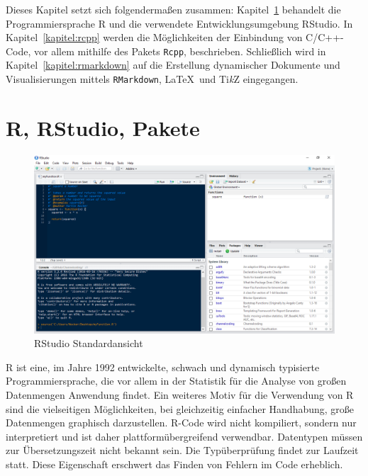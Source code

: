 Dieses Kapitel setzt sich folgendermaßen zusammen: Kapitel~\ref{kapitel:R} behandelt die Programmiersprache R und die verwendete Entwicklungsumgebung RStudio. In Kapitel~\ref{kapitel:rcpp} werden die Möglichkeiten der Einbindung von C/C++-Code, vor allem mithilfe des Pakets \texttt{Rcpp}, beschrieben. Schließlich wird in Kapitel~\ref{kapitel:rmarkdown} auf die Erstellung dynamischer Dokumente und Visualisierungen mittels \texttt{RMarkdown}, \LaTeX\ und Ti\textit{k}Z eingegangen.
\section{R, RStudio, Pakete}
\label{kapitel:R}
\begin{figure}[t]
\centering
\includegraphics[width=\ScaleIfNeeded]{abbildungen/rstudio}
\caption{RStudio Standardansicht}
\label{abb:rstudio}
\end{figure}
R ist eine, im Jahre 1992 entwickelte, schwach und dynamisch typisierte Programmiersprache, die vor allem in der Statistik für die Analyse von großen Datenmengen Anwendung findet. Ein weiteres Motiv für die Verwendung von R sind die vielseitigen Möglichkeiten, bei gleichzeitig einfacher Handhabung, große Datenmengen graphisch darzustellen. R-Code wird nicht kompiliert, sondern nur interpretiert und ist daher plattformübergreifend verwendbar. Datentypen müssen zur Übersetzungszeit nicht bekannt sein. Die Typüberprüfung findet zur Laufzeit statt. Diese Eigenschaft erschwert das Finden von Fehlern im Code erheblich.

